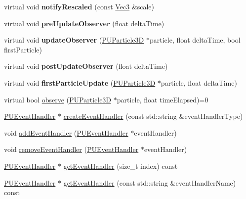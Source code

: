 \begin{DoxyCompactItemize}
\item 
\mbox{\label{classPUObserver_a5bee61b78964890ce90a5a6e508227c0}} 
virtual void {\bfseries notify\+Rescaled} (const \hyperlink{classVec3}{Vec3} \&scale)
\item 
\mbox{\label{classPUObserver_a85548534c7593d1f36a49afabbec862d}} 
virtual void {\bfseries pre\+Update\+Observer} (float delta\+Time)
\item 
\mbox{\label{classPUObserver_a21a9263fc32dca1d137e6ba39c19a316}} 
virtual void {\bfseries update\+Observer} (\hyperlink{structPUParticle3D}{P\+U\+Particle3D} $\ast$particle, float delta\+Time, bool first\+Particle)
\item 
\mbox{\label{classPUObserver_acf0be2b537a3bc3b4b647cc2c36edecb}} 
virtual void {\bfseries post\+Update\+Observer} (float delta\+Time)
\item 
\mbox{\label{classPUObserver_a221d8f1ea6e6633ec6412b4fb097fc62}} 
virtual void {\bfseries first\+Particle\+Update} (\hyperlink{structPUParticle3D}{P\+U\+Particle3D} $\ast$particle, float delta\+Time)
\item 
virtual bool \hyperlink{classPUObserver_a50f59cc3245e291b641463db5d3037f7}{observe} (\hyperlink{structPUParticle3D}{P\+U\+Particle3D} $\ast$particle, float time\+Elapsed)=0
\item 
\hyperlink{classPUEventHandler}{P\+U\+Event\+Handler} $\ast$ \hyperlink{classPUObserver_aafcac25a48541ea6dc5dd75aec100268}{create\+Event\+Handler} (const std\+::string \&event\+Handler\+Type)
\item 
void \hyperlink{classPUObserver_a5c2f1f1d9f90de62c986c0d57ee36950}{add\+Event\+Handler} (\hyperlink{classPUEventHandler}{P\+U\+Event\+Handler} $\ast$event\+Handler)
\item 
void \hyperlink{classPUObserver_abd9e5585ab25795109269ba07fbc51e6}{remove\+Event\+Handler} (\hyperlink{classPUEventHandler}{P\+U\+Event\+Handler} $\ast$event\+Handler)
\item 
\hyperlink{classPUEventHandler}{P\+U\+Event\+Handler} $\ast$ \hyperlink{classPUObserver_a50d3ac2a8c1ca063484fee39d2149e51}{get\+Event\+Handler} (size\+\_\+t index) const
\item 
\hyperlink{classPUEventHandler}{P\+U\+Event\+Handler} $\ast$ \hyperlink{classPUObserver_a01846fc48a256d5503703aad243ee813}{get\+Event\+Handler} (const std\+::string \&event\+Handler\+Name) const

\end{DoxyCompactItemize}
